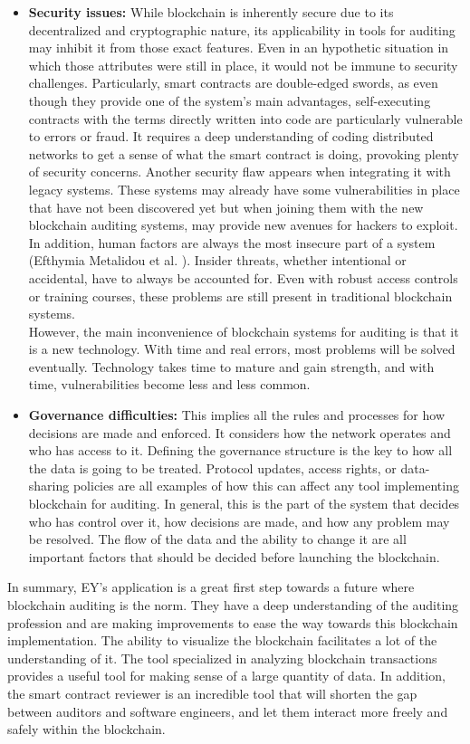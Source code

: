 \begin{itemize}
    \item \textbf{Security issues:} While blockchain is inherently secure due to its decentralized and cryptographic nature, its applicability in tools for auditing may inhibit it from those exact features. Even in an hypothetic situation in which those attributes were still in place, it would not be immune to security challenges. Particularly, smart contracts are double-edged swords, as even though they provide one of the system's main advantages, self-executing contracts with the terms directly written into code are particularly vulnerable to errors or fraud. It requires a deep understanding of coding distributed networks to get a sense of what the smart contract is doing, provoking plenty of security concerns. Another security flaw appears when integrating it with legacy systems. These systems may already have some vulnerabilities in place that have not been discovered yet but when joining them with the new blockchain auditing systems, may provide new avenues for hackers to exploit. In addition, human factors are always the most insecure part of a system (Efthymia Metalidou et al. \cite{humanFactor}). Insider threats, whether intentional or accidental, have to always be accounted for. Even with robust access controls or training courses, these problems are still present in traditional blockchain systems. \\
    However, the main inconvenience of blockchain systems for auditing is that it is a new technology. With time and real errors, most problems will be solved eventually. Technology takes time to mature and gain strength, and with time, vulnerabilities become less and less common.
    \item \textbf{Governance difficulties:} This implies all the rules and processes for how decisions are made and enforced. It considers how the network operates and who has access to it. Defining the governance structure is the key to how all the data is going to be treated. Protocol updates, access rights, or data-sharing policies are all examples of how this can affect any tool implementing blockchain for auditing. In general, this is the part of the system that decides who has control over it, how decisions are made, and how any problem may be resolved. The flow of the data and the ability to change it are all important factors that should be decided before launching the blockchain. 
\end{itemize}

In summary, EY's application is a great first step towards a future where blockchain auditing is the norm. They have a deep understanding of the auditing profession and are making improvements to ease the way towards this blockchain implementation. The ability to visualize the blockchain facilitates a lot of the understanding of it. The tool specialized in analyzing blockchain transactions provides a useful tool for making sense of a large quantity of data. In addition, the smart contract reviewer is an incredible tool that will shorten the gap between auditors and software engineers, and let them interact more freely and safely within the blockchain.

